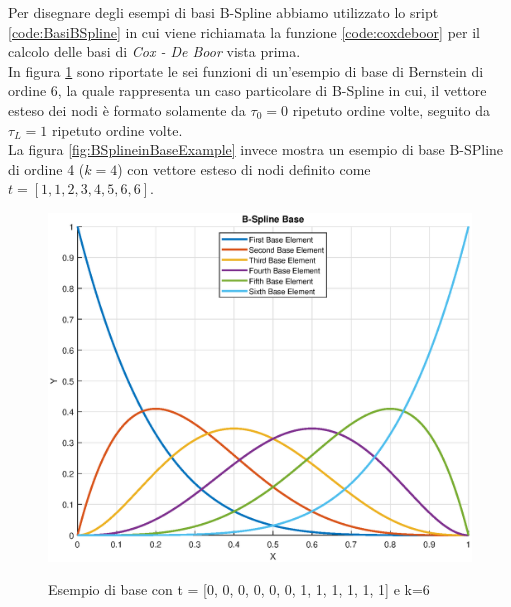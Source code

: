 \documentclass[a4paper, 12pt]{article}
\begin{document}


Per disegnare degli esempi di basi B-Spline abbiamo utilizzato lo sript \ref{code:BasiBSpline} in cui viene richiamata la funzione \ref{code:coxdeboor} per il calcolo delle basi di \textit{Cox - De Boor} vista prima.\\
In figura \ref{fig:BernsteinBaseExample} sono riportate le sei funzioni di un'esempio di base di Bernstein di ordine 6, la quale rappresenta un caso particolare di B-Spline in cui, il vettore esteso dei nodi è formato solamente da $\tau_0=0$ ripetuto ordine volte, seguito da $\tau_L=1$ ripetuto ordine volte.\\
La figura \ref{fig:BSplineinBaseExample} invece mostra un esempio di base B-SPline di ordine 4 ($k = 4$) con vettore esteso di nodi definito come $t = [1, 1, 2, 3, 4, 5, 6, 6]$.\newpage



\begin{figure}[h]
	\centering
	\caption{Esempio di base con t = [0, 0, 0, 0, 0, 0, 1, 1, 1, 1, 1, 1] e k=6}
	\includegraphics[scale=0.7]{bezier_base_plot.eps}
	\label{fig:BernsteinBaseExample}
\end{figure}
\end{document}

